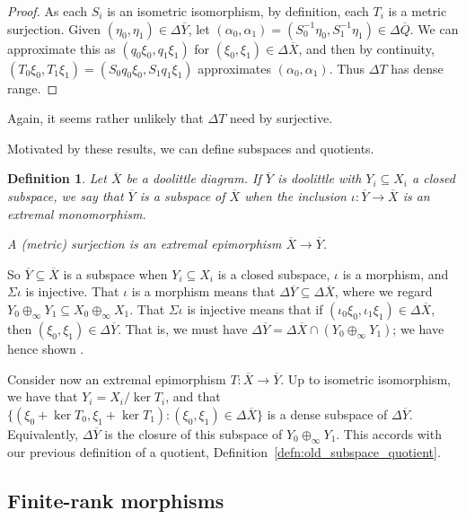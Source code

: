 \documentclass[a4paper,11pt]{article}
\theoremstyle{plain}
\newtheorem{definition}[proposition]{Definition}
\theoremstyle{remark}
\begin{document}
\begin{proof}
As each $S_i$ is an isometric isomorphism, by definition, each $T_i$ is a metric surjection.  Given $(\eta_0, \eta_1)\in\Delta\overline Y$, let $(\alpha_0,\alpha_1) = (S_0^{-1}\eta_0, S_1^{-1}\eta_1) \in \Delta\overline Q$.  We can approximate this as $(q_0\xi_0, q_1\xi_1)$ for $(\xi_0,\xi_1)\in\Delta\overline X$, and then by continuity, $(T_0\xi_0, T_1\xi_1) = (S_0q_0\xi_0, S_1q_1\xi_1)$ approximates $(\alpha_0, \alpha_1)$.  Thus $\Delta T$ has dense range.
\end{proof}

Again, it seems rather unlikely that $\Delta T$ need by surjective.

Motivated by these results, we can define subspaces and quotients.

\begin{definition}\label{defn:subspace_quotient}
Let $\overline X$ be a doolittle diagram.  If $\overline Y$ is doolittle with $Y_i \subseteq X_i$ a closed subspace, we say that $\overline Y$ is a \emph{subspace} of $\overline X$ when the inclusion $\iota\colon\overline Y\to\overline X$ is an extremal monomorphism.

A \emph{(metric) surjection} is an extremal epimorphism $\overline X \to \overline Y$.
\end{definition}

So $\overline Y \subseteq \overline X$ is a subspace when $Y_i \subseteq X_i$ is a closed subspace, $\iota$ is a morphism, and $\Sigma\iota$ is injective.  That $\iota$ is a morphism means that $\Delta\overline Y \subseteq \Delta\overline X$, where we regard $Y_0\oplus_\infty Y_1 \subseteq X_0\oplus_\infty X_1$.  That $\Sigma\iota$ is injective means that if $(\iota_0\xi_0, \iota_1\xi_1) \in \Delta\overline X$, then $(\xi_0,\xi_1) \in \Delta\overline Y$.  That is, we must have $\Delta\overline Y = \Delta\overline X \cap (Y_0 \oplus_\infty Y_1)$; we have hence shown \cite[Proposition~3.8]{KP_InterpolationFunctorsDuality}.

Consider now an extremal epimorphism $T \colon \overline X \to \overline Y$.  Up to isometric isomorphism, we have that $Y_i = X_i / \ker T_i$, and that $\{ (\xi_0+\ker T_0, \xi_1+\ker T_1) : (\xi_0,\xi_1) \in \Delta\overline X\}$ is a dense subspace of $\Delta\overline Y$.  Equivalently, $\Delta\overline Y$ is the closure of this subspace of $Y_0 \oplus_\infty Y_1$.  This accords with our previous definition of a quotient, Definition~\ref{defn:old_subspace_quotient}.


\subsection{Finite-rank morphisms}
\end{document}
